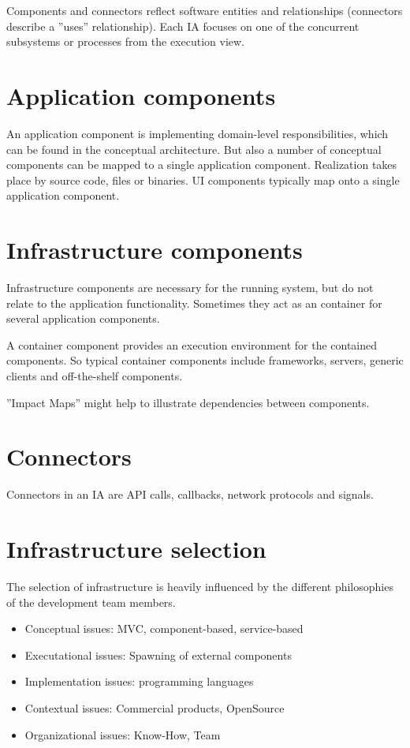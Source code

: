 \documentclass[a4paper]{report}
\begin{document}
Components and connectors reflect software entities and relationships
(connectors describe a ''uses'' relationship). Each IA focuses on one of the
concurrent subsystems or processes from the execution view.

\section{Application components}

An application component is implementing domain-level responsibilities,
which can be found in the conceptual architecture. But also a number of
conceptual components can be mapped to a single application component.
Realization takes place by source code, files or binaries. UI components
typically map onto a single application component.

\section{Infrastructure components}

Infrastructure components are necessary for the running system, but do not
relate to the application functionality. Sometimes they act as an container
for several application components.

A container component provides an execution environment for the contained
components. So typical container components include frameworks, servers,
generic clients and off-the-shelf components.

''Impact Maps'' might help to illustrate dependencies between components.

\section{Connectors}

Connectors in an IA are API calls, callbacks, network protocols and signals.

\section{Infrastructure selection}

The selection of infrastructure is heavily influenced by the different
philosophies of the development team members.

\begin{itemize}
  \item Conceptual issues: MVC, component-based, service-based
  \item Executational issues: Spawning of external components
  \item Implementation issues: programming languages
  \item Contextual issues: Commercial products, OpenSource
  \item Organizational issues: Know-How, Team
\end{itemize}
\end{document}
